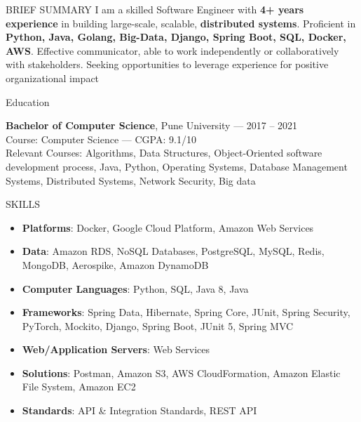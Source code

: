 \documentclass{resume} %
\begin{document}

\begin{rSection}{BRIEF SUMMARY}
\linespread{1.0}
{ I am a skilled Software Engineer with\textbf{ 4+ years experience} in building large-scale, scalable, \textbf{distributed systems}. Proficient in \textbf{Python, Java, Golang, Big-Data, Django, Spring Boot, SQL, Docker, AWS}. Effective communicator, able to work independently or collaboratively with stakeholders. Seeking opportunities to leverage experience for positive organizational impact }


\end{rSection}

\begin{rSection}{Education}

{\bf Bachelor  of Computer Science}, Pune University --- 2017 -- 2021\\
Course: Computer Science --- CGPA: 9.1/10\\
Relevant Courses: Algorithms, Data Structures, Object-Oriented software development process, Java, Python, Operating  Systems, Database Management Systems, Distributed Systems, Network Security, Big data



\end{rSection}

\begin{rSection}{SKILLS}
\begin{itemize}
    \item \textbf{Platforms}: Docker, Google Cloud Platform, Amazon Web Services
    \item \textbf{Data}: Amazon RDS, NoSQL Databases, PostgreSQL, MySQL, Redis, MongoDB, Aerospike, Amazon DynamoDB
    \item \textbf{Computer Languages}: Python, SQL, Java 8, Java
    \item \textbf{Frameworks}: Spring Data, Hibernate, Spring Core, JUnit, Spring Security, PyTorch, Mockito, Django, Spring Boot, JUnit 5, Spring MVC
    \item \textbf{Web/Application Servers}: Web Services
    \item \textbf{Solutions}: Postman, Amazon S3, AWS CloudFormation, Amazon Elastic File System, Amazon EC2
    \item \textbf{Standards}: API \& Integration Standards, REST API
\end{itemize}
\end{rSection}
\end{document}
